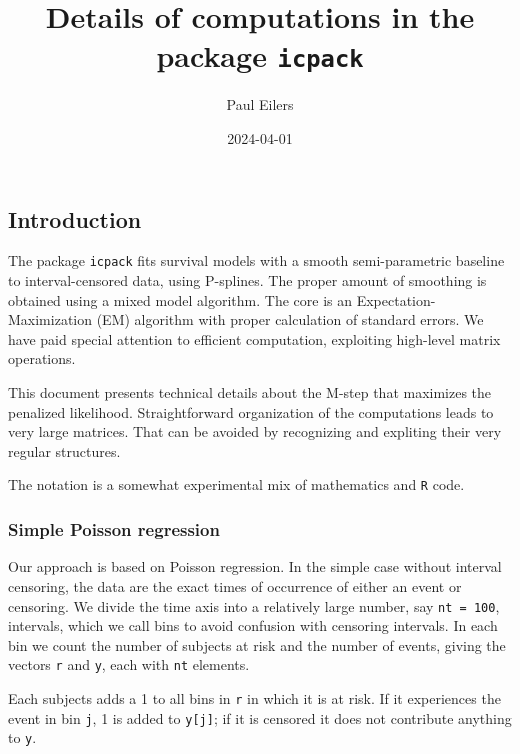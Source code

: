 \documentclass[
  letterpaper,
  DIV=11,
  numbers=noendperiod]{scrartcl}
\title{Details of computations in the package \texttt{icpack}}
\author{Paul Eilers}
\date{2024-04-01}
\begin{document}
\maketitle
\ifdefined\Shaded\renewenvironment{Shaded}{\begin{tcolorbox}[borderline west={3pt}{0pt}{shadecolor}, breakable, interior hidden, boxrule=0pt, enhanced, frame hidden, sharp corners]}{\end{tcolorbox}}\fi

\hypertarget{introduction}{%
\subsection{Introduction}\label{introduction}}

The package \texttt{icpack} fits survival models with a smooth
semi-parametric baseline to interval-censored data, using P-splines. The
proper amount of smoothing is obtained using a mixed model algorithm.
The core is an Expectation-Maximization (EM) algorithm with proper
calculation of standard errors. We have paid special attention to
efficient computation, exploiting high-level matrix operations.

This document presents technical details about the M-step that maximizes
the penalized likelihood. Straightforward organization of the
computations leads to very large matrices. That can be avoided by
recognizing and expliting their very regular structures.

The notation is a somewhat experimental mix of mathematics and
\texttt{R} code.

\hypertarget{simple-poisson-regression}{%
\subsubsection{Simple Poisson
regression}\label{simple-poisson-regression}}

Our approach is based on Poisson regression. In the simple case without
interval censoring, the data are the exact times of occurrence of either
an event or censoring. We divide the time axis into a relatively large
number, say \texttt{nt\ =\ 100}, intervals, which we call bins to avoid
confusion with censoring intervals. In each bin we count the number of
subjects at risk and the number of events, giving the vectors \texttt{r}
and \texttt{y}, each with \texttt{nt} elements.

Each subjects adds a 1 to all bins in \texttt{r} in which it is at risk.
If it experiences the event in bin \texttt{j}, 1 is added to
\texttt{y{[}j{]}}; if it is censored it does not contribute anything to
\texttt{y}.
\end{document}
